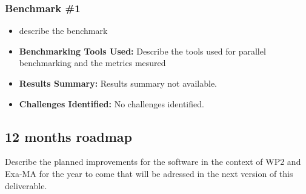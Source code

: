 \subsubsection{Benchmark \#1}
\begin{itemize}
    \item describe the benchmark
    \item \textbf{Benchmarking Tools Used:} Describe the tools used for parallel benchmarking and the metrics mesured
    \item \textbf{Results Summary:} Results summary not available.
    \item \textbf{Challenges Identified:} No challenges identified.
\end{itemize}

\subsection{12 months roadmap}
\label{sec:WP2:Feel++:roadmap}

Describe the planned improvements  for the software in the context of WP2 and Exa-MA for the year to come that will be adressed in the next version of this deliverable.